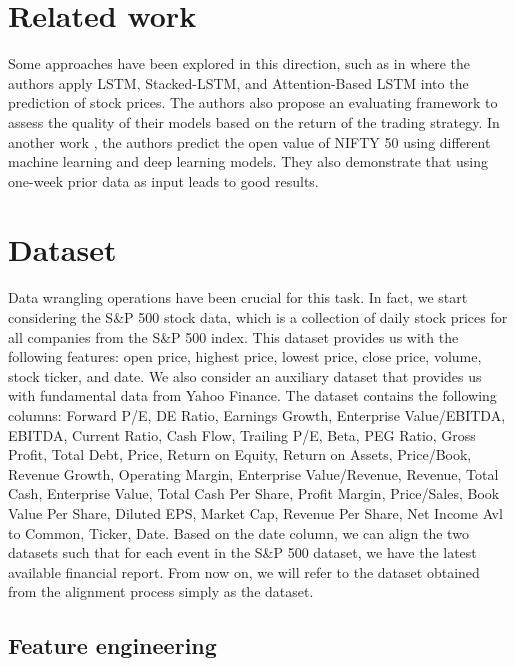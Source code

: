 \documentclass{article}
\begin{document}
\section{Related work}

Some approaches have been explored in this direction, such as in \cite{32066186} where the authors apply LSTM, Stacked-LSTM, and Attention-Based LSTM into the prediction of stock prices. The authors also propose an evaluating framework to assess the quality of their models based on the return of the trading strategy. In another work \cite{mehtab2020stock}, the authors predict the open value of NIFTY 50 using different machine learning and deep learning models. They also demonstrate that using one-week prior data as input leads to good results.

\section{Dataset}

Data wrangling operations have been crucial for this task. In fact, we start considering the S\&P 500 stock data, which is a collection of daily stock prices for all companies from the S\&P 500 index. This dataset provides us with the following features: open price, highest price, lowest price, close price, volume, stock ticker, and date. We also consider an auxiliary dataset that provides us with fundamental data from Yahoo Finance. The dataset contains the following columns: Forward P/E, DE Ratio, Earnings Growth, Enterprise Value/EBITDA, EBITDA, Current Ratio, Cash Flow, Trailing P/E, Beta, PEG Ratio, Gross Profit, Total Debt, Price, Return on Equity, Return on Assets, Price/Book, Revenue Growth, Operating Margin, Enterprise Value/Revenue, Revenue, Total Cash, Enterprise Value, Total Cash Per Share, Profit Margin, Price/Sales, Book Value Per Share, Diluted EPS, Market Cap, Revenue Per Share, Net Income Avl to Common, Ticker, Date. Based on the date column, we can align the two datasets such that for each event in the S\&P 500 dataset, we have the latest available financial report. From now on, we will refer to the dataset obtained from the alignment process simply as the dataset.

\subsection{Feature engineering}
\end{document}
